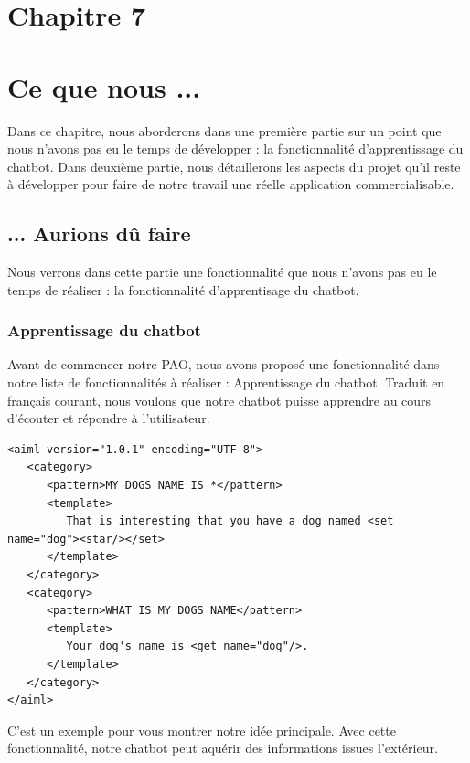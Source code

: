 \section*{Chapitre 7}
\section{Ce que nous ...}
\indent Dans ce chapitre, nous aborderons dans une première partie sur un point que nous n'avons pas eu le temps de développer :  la fonctionnalité d’apprentissage du chatbot. Dans deuxième partie, nous détaillerons les aspects du projet qu'il reste à développer pour faire de notre travail une réelle application commercialisable.

\subsection{... Aurions dû faire}
\indent Nous verrons dans cette partie une fonctionnalité que nous n'avons pas eu le temps de réaliser : la fonctionnalité d'apprentisage du chatbot.

\subsubsection{Apprentissage du chatbot}
\indent Avant de commencer notre PAO, nous avons proposé une fonctionnalité dans notre liste de fonctionnalités à réaliser : Apprentissage du chatbot. Traduit en français courant, nous voulons que notre chatbot puisse apprendre au cours d'écouter et répondre à l'utilisateur. 

\begin{lstlisting}[frame=none,aboveskip=0.5em]
<aiml version="1.0.1" encoding="UTF-8">
   <category>
      <pattern>MY DOGS NAME IS *</pattern>
      <template>
         That is interesting that you have a dog named <set name="dog"><star/></set>
      </template>  
   </category>  
   <category>
      <pattern>WHAT IS MY DOGS NAME</pattern>
      <template>
         Your dog's name is <get name="dog"/>.
      </template>  
   </category>  
</aiml>
\end{lstlisting}

\indent C'est un exemple pour vous montrer notre idée principale. Avec cette fonctionnalité, notre chatbot peut aquérir des informations issues l'extérieur.

